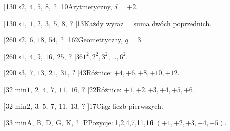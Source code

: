 
\ExerciseSlide[\CategoryBadge[SeqColor!20]{Ci\k{a}g}]{1}{30 s}{$2,\ 4,\ 6,\ 8,\ \mathbf{?}$}
\AnswerSlide[\CategoryBadge[SeqColor!20]{Ci\k{a}g}]{10}{Arytmetyczny, $d = +2$.}

\ExerciseSlide[\CategoryBadge[SeqColor!20]{Fibonacci}]{1}{30 s}{$1,\ 1,\ 2,\ 3,\ 5,\ 8,\ \mathbf{?}$}
\AnswerSlide[\CategoryBadge[SeqColor!20]{Fibonacci}]{13}{Ka\. zdy wyraz = suma dw\'{o}ch poprzednich.}

\ExerciseSlide[\CategoryBadge[SeqColor!20]{Ci\k{a}g}]{2}{60 s}{$2,\ 6,\ 18,\ 54,\ \mathbf{?}$}
\AnswerSlide[\CategoryBadge[SeqColor!20]{Ci\k{a}g}]{162}{Geometryczny, $q = 3$.}

\ExerciseSlide[\CategoryBadge[SeqColor!20]{Wzorzec}]{2}{60 s}{$1,\ 4,\ 9,\ 16,\ 25,\ \mathbf{?}$}
\AnswerSlide[\CategoryBadge[SeqColor!20]{Wzorzec}]{36}{$1^2, 2^2, 3^2, \ldots, 6^2$.}

\ExerciseSlide[\CategoryBadge[SeqColor!20]{R\'{o}\. znice}]{2}{90 s}{$3,\ 7,\ 13,\ 21,\ 31,\ \mathbf{?}$}
\AnswerSlide[\CategoryBadge[SeqColor!20]{R\'{o}\. znice}]{43}{R\'{o}\. znice: $+4, +6, +8, +10, +12$.}

\ExerciseSlide[\CategoryBadge[SeqColor!20]{R\'{o}\. znice}]{3}{2 min}{$1,\ 2,\ 4,\ 7,\ 11,\ 16,\ \mathbf{?}$}
\AnswerSlide[\CategoryBadge[SeqColor!20]{R\'{o}\. znice}]{22}{R\'{o}\. znice: $+1, +2, +3, +4, +5, +6$.}

\ExerciseSlide[\CategoryBadge[SeqColor!20]{Pierwsze}]{3}{2 min}{$2,\ 3,\ 5,\ 7,\ 11,\ 13,\ \mathbf{?}$}
\AnswerSlide[\CategoryBadge[SeqColor!20]{Pierwsze}]{17}{Ci\k{a}g liczb pierwszych.}

\ExerciseSlide[\CategoryBadge[SeqColor!20]{Literowy}]{3}{3 min}{$\mathrm{A,\ B,\ D,\ G,\ K,\ \mathbf{?}}$}
\AnswerSlide[\CategoryBadge[SeqColor!20]{Literowy}]{P}{Pozycje: 1,2,4,7,11,\textbf{16} $(+1,+2,+3,+4,+5)$.}
